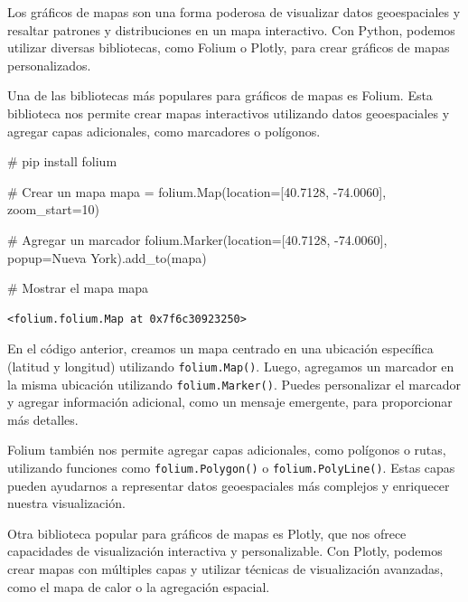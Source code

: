 \documentclass[
  a4paper,
]{article}
\newenvironment{Shaded}{}{}
\newcommand{\CommentTok}[1]{\textcolor[rgb]{0.42,0.45,0.49}{#1}}
\newcommand{\DecValTok}[1]{\textcolor[rgb]{0.00,0.36,0.77}{#1}}
\newcommand{\FloatTok}[1]{\textcolor[rgb]{0.00,0.36,0.77}{#1}}
\newcommand{\NormalTok}[1]{\textcolor[rgb]{0.14,0.16,0.18}{#1}}
\newcommand{\OperatorTok}[1]{\textcolor[rgb]{0.14,0.16,0.18}{#1}}
\newcommand{\StringTok}[1]{\textcolor[rgb]{0.01,0.18,0.38}{#1}}
\begin{document}
Los gráficos de mapas son una forma poderosa de visualizar datos
geoespaciales y resaltar patrones y distribuciones en un mapa
interactivo. Con Python, podemos utilizar diversas bibliotecas, como
Folium o Plotly, para crear gráficos de mapas personalizados.

Una de las bibliotecas más populares para gráficos de mapas es Folium.
Esta biblioteca nos permite crear mapas interactivos utilizando datos
geoespaciales y agregar capas adicionales, como marcadores o polígonos.

\begin{Shaded}
\begin{Highlighting}[]
\CommentTok{\# pip install folium}

\CommentTok{\# Crear un mapa}
\NormalTok{mapa }\OperatorTok{=}\NormalTok{ folium.Map(location}\OperatorTok{=}\NormalTok{[}\FloatTok{40.7128}\NormalTok{, }\OperatorTok{{-}}\FloatTok{74.0060}\NormalTok{], zoom\_start}\OperatorTok{=}\DecValTok{10}\NormalTok{)}

\CommentTok{\# Agregar un marcador}
\NormalTok{folium.Marker(location}\OperatorTok{=}\NormalTok{[}\FloatTok{40.7128}\NormalTok{, }\OperatorTok{{-}}\FloatTok{74.0060}\NormalTok{], popup}\OperatorTok{=}\StringTok{\textquotesingle{}Nueva York\textquotesingle{}}\NormalTok{).add\_to(mapa)}

\CommentTok{\# Mostrar el mapa}
\NormalTok{mapa}
\end{Highlighting}
\end{Shaded}

\begin{verbatim}
<folium.folium.Map at 0x7f6c30923250>
\end{verbatim}

En el código anterior, creamos un mapa centrado en una ubicación
específica (latitud y longitud) utilizando \texttt{folium.Map()}. Luego,
agregamos un marcador en la misma ubicación utilizando
\texttt{folium.Marker()}. Puedes personalizar el marcador y agregar
información adicional, como un mensaje emergente, para proporcionar más
detalles.

Folium también nos permite agregar capas adicionales, como polígonos o
rutas, utilizando funciones como \texttt{folium.Polygon()} o
\texttt{folium.PolyLine()}. Estas capas pueden ayudarnos a representar
datos geoespaciales más complejos y enriquecer nuestra visualización.

Otra biblioteca popular para gráficos de mapas es Plotly, que nos ofrece
capacidades de visualización interactiva y personalizable. Con Plotly,
podemos crear mapas con múltiples capas y utilizar técnicas de
visualización avanzadas, como el mapa de calor o la agregación espacial.
\end{document}
